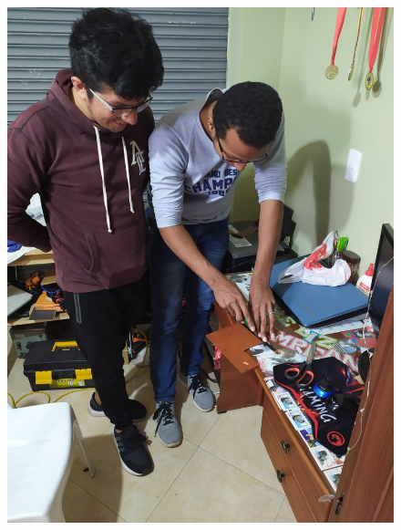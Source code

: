 \documentclass[10pt,a4paper]{article}
\begin{document}
\begin{multicols}{2}
\begin{figure}[H]
\includegraphics[scale=0.18]{gg}
\end{figure}
\end{multicols}


\end{document}
